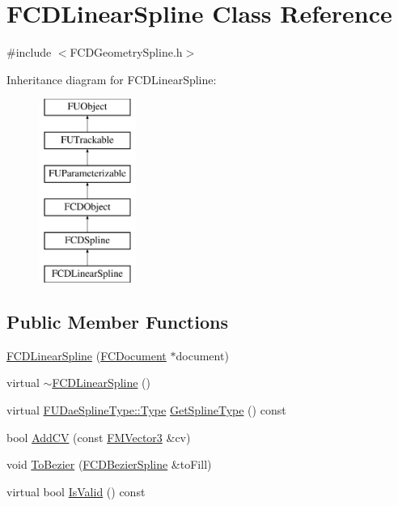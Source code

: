 \hypertarget{classFCDLinearSpline}{
\section{FCDLinearSpline Class Reference}
\label{classFCDLinearSpline}
}


{\ttfamily \#include $<$FCDGeometrySpline.h$>$}

Inheritance diagram for FCDLinearSpline:\begin{figure}[H]
\begin{center}
\leavevmode
\includegraphics[height=6.000000cm]{classFCDLinearSpline}
\end{center}
\end{figure}
\subsection*{Public Member Functions}
\begin{DoxyCompactItemize}
\item 
\hyperlink{classFCDLinearSpline_af5e74815103de8aab4ae286f19acf5ab}{FCDLinearSpline} (\hyperlink{classFCDocument}{FCDocument} $\ast$document)
\item 
virtual \hyperlink{classFCDLinearSpline_a96e58db71e95b864b7f8f2cb39479afd}{$\sim$FCDLinearSpline} ()
\item 
virtual \hyperlink{namespaceFUDaeSplineType_a7db2b90bcd53814239cc29f64754d0ab}{FUDaeSplineType::Type} \hyperlink{classFCDLinearSpline_a7ec1ac08cadd6504ad7dd2a5cbd91640}{GetSplineType} () const 
\item 
bool \hyperlink{classFCDLinearSpline_a24ef6b2ff41fc49d42472da57875684b}{AddCV} (const \hyperlink{classFMVector3}{FMVector3} \&cv)
\item 
void \hyperlink{classFCDLinearSpline_a06be2f207432851791b269fcd9074779}{ToBezier} (\hyperlink{classFCDBezierSpline}{FCDBezierSpline} \&toFill)
\item 
virtual bool \hyperlink{classFCDLinearSpline_a39a847cadde3904109b811b2e1fd0794}{IsValid} () const 
\end{DoxyCompactItemize}


